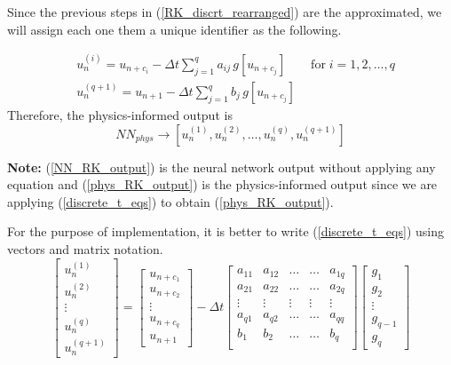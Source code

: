 \documentclass[a4paper, onecolumn, 12pt]{article}
\begin{document}
Since the previous steps in (\ref{RK_discrt_rearranged}) are the approximated, we will assign each one 
them a unique identifier as the following.

\begin{equation}\label{discrete_t_eqs}
\begin{aligned}
& u_n^{(i)} = u_{n+c_i} -  \Delta t \sum_{j=1}^{q} a_{ij} \, g[u_{n+c_j}] 
\qquad \text{for} \; i = 1, 2, \dots, q \\
& u_n^{(q+1)} = u_{n+1} - \Delta t \sum_{j=1}^{q} b_j \, g[u_{n+c_j}] 
\end{aligned}
\end{equation}
Therefore, the physics-informed output is 
\begin{equation}\label{phys_RK_output}
NN_{phys} \rightarrow [u_{n}^{(1)}, u_n^{(2)}, \dots, u_n^{(q)}, u_n^{(q+1)}]
\end{equation}

\textbf{Note:} (\ref{NN_RK_output}) is the neural network output without applying any equation 
and (\ref{phys_RK_output}) is the physics-informed output since we are applying (\ref{discrete_t_eqs})
to obtain (\ref{phys_RK_output}). 

For the purpose of implementation, it is better to write (\ref{discrete_t_eqs}) using vectors and 
matrix notation.
\begin{equation}
\begin{bmatrix}
    u_{n}^{(1)} \\ u_n^{(2)} \\ \vdots \\ u_n^{(q)} \\ u_n^{(q+1)}   
\end{bmatrix}
=
\begin{bmatrix}
u_{n+c_1} \\ u_{n+c_2} \\ \vdots \\ u_{n+c_q} \\ u_{n+1}
\end{bmatrix}
-
\Delta t
\begin{bmatrix}
    a_{11} & a_{12} & \dots & \dots & a_{1q} \\
    a_{21} & a_{22} & \dots & \dots & a_{2q} \\
    \vdots & \vdots & \vdots & \vdots & \vdots \\
    a_{q1} & a_{q2} & \dots & \dots & a_{qq} \\
    b_{1} & b_{2} & \dots & \dots & b_{q} \\
\end{bmatrix}
\begin{bmatrix}
g_1 \\ g_2 \\ \vdots \\ g_{q-1} \\ g_{q}
\end{bmatrix}
\end{equation}
\end{document}
